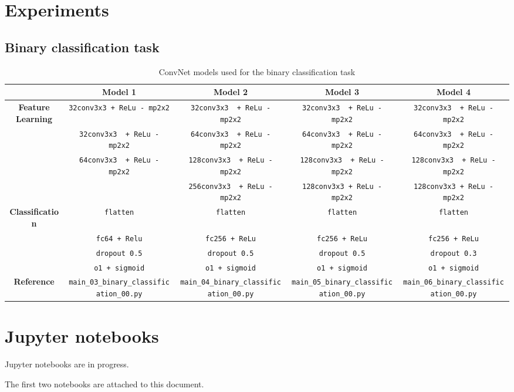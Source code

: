 \documentclass[12pt]{article}
\begin{document}
\section{Experiments}
\subsection{Binary classification task}

\begin{table}[H]
	\caption{ConvNet models used for the binary classification task} \label{table:bin:method}
	\centering
	\begin{adjustbox}{max width=\textwidth}
		\begin{tabular}{| c | c | c | c | c |}
			\hline
			& \textbf{Model 1} & \textbf{Model 2}  &  \textbf{Model 3} & \textbf{Model 4}\\
			\hline \hline
			\textbf{Feature Learning} &  \verb|32conv3x3 + ReLu - mp2x2| & \verb|32conv3x3  + ReLu - mp2x2| & \verb|32conv3x3  + ReLu - mp2x2| & \verb|32conv3x3  + ReLu - mp2x2| \\
			& \verb|32conv3x3  + ReLu - mp2x2| & \verb|64conv3x3  + ReLu - mp2x2| & \verb|64conv3x3  + ReLu - mp2x2| & \verb|64conv3x3  + ReLu - mp2x2|\\
			& \verb|64conv3x3  + ReLu - mp2x2| & \verb|128conv3x3  + ReLu - mp2x2| & \verb|128conv3x3  + ReLu - mp2x2| & \verb|128conv3x3  + ReLu - mp2x2|\\
			& & \verb|256conv3x3  + ReLu - mp2x2| &  \verb|128conv3x3 + ReLu - mp2x2| & \verb|128conv3x3 + ReLu - mp2x2| \\
			\hline
			\textbf{Classification} & \verb|flatten| & \verb|flatten| & \verb|flatten| & \verb|flatten|\\
			& \verb|fc64 + Relu| & \verb|fc256 + ReLu| & \verb|fc256 + ReLu| & \verb|fc256 + ReLu| \\
			& \verb|dropout 0.5| & \verb|dropout 0.5| & \verb|dropout 0.5| & \verb|dropout 0.3|\\
			& \verb|o1 + sigmoid| & \verb|o1 + sigmoid| & \verb|o1 + sigmoid| & \verb|o1 + sigmoid| \\
			\hline
			\textbf{Reference} & \verb|main_03_binary_classification_00.py| & \verb|main_04_binary_classification_00.py| & \verb|main_05_binary_classification_00.py| & \verb|main_06_binary_classification_00.py| \\ 
			\hline
		\end{tabular}%
	\end{adjustbox}
\end{table}

\section{Jupyter notebooks}
Jupyter notebooks are in progress.

The first two notebooks are attached to this document.
\end{document}
